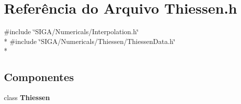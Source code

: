 \section{Referência do Arquivo Thiessen.\+h}
\label{_thiessen_8h}
{\ttfamily \#include \char`\"{}S\+I\+G\+A/\+Numericals/\+Interpolation.\+h\char`\"{}}\\*
{\ttfamily \#include \char`\"{}S\+I\+G\+A/\+Numericals/\+Thiessen/\+Thiessen\+Data.\+h\char`\"{}}\\*
\subsection*{Componentes}
\begin{DoxyCompactItemize}
\item 
class {\bf Thiessen}
\end{DoxyCompactItemize}
